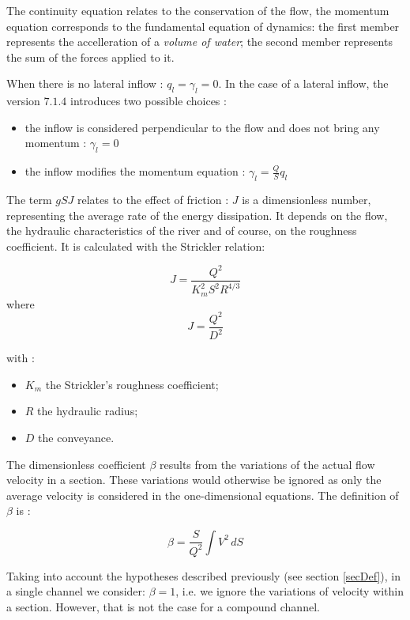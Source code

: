 The continuity equation relates to the conservation of the flow, the momentum equation corresponds to the fundamental equation of dynamics: the first member represents the accelleration of a \textit{volume of water}; the second member represents the sum of the forces applied to it.

When there is no lateral inflow : $q_l = \gamma_l = 0$. In the case of a lateral inflow, the version $7.1.4$ introduces two possible choices :

\begin{itemize}
 \item the inflow is considered perpendicular to the flow and does not bring any momentum : $\gamma_l = 0$
 \item the inflow modifies the momentum equation : $\gamma_l = \frac{Q}{S}q_l$
\end{itemize}

The term $gSJ$ relates to the effect of friction : $J$ is a dimensionless number, representing the average rate of the energy dissipation. It depends on the flow, the hydraulic characteristics of the river and of course, on the roughness coefficient. It is calculated with the Strickler relation:

   \begin{equation}
     J = \frac{Q^2}{K_{m}^{2}S^{2}R^{4/3}}
   \end{equation}
where
   \begin{equation}
     J = \frac{Q^2}{D^2}
   \end{equation}

with :
\begin{itemize}
 \item $K_m$ the Strickler's roughness coefficient;
 \item $R$ the hydraulic radius;
 \item $D$ the conveyance.
\end{itemize}

The dimensionless coefficient $\beta$ results from the variations of the actual flow velocity in a section. These variations would otherwise be ignored as only the average velocity is considered in the one-dimensional equations. The definition of $\beta$ is :

   \begin{equation}
     \beta = \frac{S}{Q^2} \int V^2 \,dS
   \end{equation}

Taking into account the hypotheses described previously (see section \ref{secDef}), in a single channel we consider: $\beta = 1$, i.e. we ignore the variations of velocity within a section. However, that is not the case for a compound channel.

